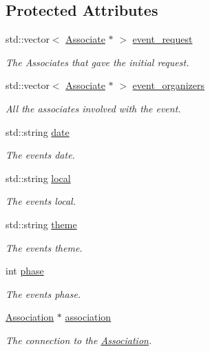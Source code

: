 \subsection*{Protected Attributes}
\begin{DoxyCompactItemize}
\item 
std\+::vector$<$ \mbox{\hyperlink{classAssociate}{Associate}} $\ast$ $>$ \mbox{\hyperlink{classEvent_a6cec387dca85f0a0e8419cfc94eb320e}{event\+\_\+request}}
\begin{DoxyCompactList}\small\item\em The Associates that gave the initial request. \end{DoxyCompactList}\item 
std\+::vector$<$ \mbox{\hyperlink{classAssociate}{Associate}} $\ast$ $>$ \mbox{\hyperlink{classEvent_ad35e04c759fdbfad75aed0b6e2eef63c}{event\+\_\+organizers}}
\begin{DoxyCompactList}\small\item\em All the associates involved with the event. \end{DoxyCompactList}\item 
std\+::string \mbox{\hyperlink{classEvent_a9a93c9d38211f84cd6e347690e177f11}{date}}
\begin{DoxyCompactList}\small\item\em The event\textquotesingle{}s date. \end{DoxyCompactList}\item 
std\+::string \mbox{\hyperlink{classEvent_a3d1f28a3bde9ab718d5b0003f8ab5129}{local}}
\begin{DoxyCompactList}\small\item\em The event\textquotesingle{}s local. \end{DoxyCompactList}\item 
std\+::string \mbox{\hyperlink{classEvent_aa9cc4378d5cecaadc8e6de92b313e6f8}{theme}}
\begin{DoxyCompactList}\small\item\em The event\textquotesingle{}s theme. \end{DoxyCompactList}\item 
int \mbox{\hyperlink{classEvent_a4059db56458a92ddb5bd1d1443631b02}{phase}}
\begin{DoxyCompactList}\small\item\em The event\textquotesingle{}s phase. \end{DoxyCompactList}\item 
\mbox{\hyperlink{classAssociation}{Association}} $\ast$ \mbox{\hyperlink{classEvent_a3c8694833e50dbd2e37943eff1f5c9b1}{association}}
\begin{DoxyCompactList}\small\item\em The connection to the \mbox{\hyperlink{classAssociation}{Association}}. \end{DoxyCompactList}\end{DoxyCompactItemize}


